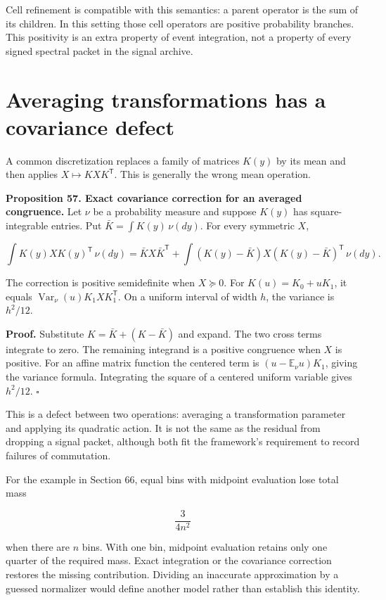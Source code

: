 Cell refinement is compatible with this semantics: a parent operator is
the sum of its children. In this setting those cell operators are
positive probability branches. This positivity is an extra property of
event integration, not a property of every signed spectral packet in the
signal archive.

\section{Averaging transformations has a covariance defect}\label{LSM:averaging-transformations-has-a-covariance-defect}

A common discretization replaces a family of matrices \(K(y)\) by its
mean and then applies \(X\mapsto KXK^{\mathsf T}\). This is generally
the wrong mean operation.

\textbf{Proposition 57. Exact covariance correction for an averaged
congruence.} Let \(\nu\) be a probability measure and suppose \(K(y)\)
has square-integrable entries. Put \(\bar K=\int K(y)\,\nu(dy)\). For
every symmetric \(X\),

\[
\boxed{
\int K(y)XK(y)^{\mathsf T}\,\nu(dy)
=\bar KX\bar K^{\mathsf T}
+\int (K(y)-\bar K)X(K(y)-\bar K)^{\mathsf T}\,\nu(dy).
}
\]

The correction is positive semidefinite when \(X\succeq0\). For
\(K(u)=K_0+uK_1\), it equals
\(\operatorname{Var}_\nu(u)K_1XK_1^{\mathsf T}\). On a uniform interval
of width \(h\), the variance is \(h^2/12\).

\textbf{Proof.} Substitute \(K=\bar K+(K-\bar K)\) and expand. The two
cross terms integrate to zero. The remaining integrand is a positive
congruence when \(X\) is positive. For an affine matrix function the
centered term is \((u-\mathbb E_\nu u)K_1\), giving the variance
formula. Integrating the square of a centered uniform variable gives
\(h^2/12\). \(\square\)

This is a defect between two operations: averaging a transformation
parameter and applying its quadratic action. It is not the same as the
residual from dropping a signal packet, although both fit the
framework's requirement to record failures of commutation.

For the example in Section 66, equal bins with midpoint evaluation lose
total mass

\[
\boxed{\frac{3}{4n^2}}
\]

when there are \(n\) bins. With one bin, midpoint evaluation retains
only one quarter of the required mass. Exact integration or the
covariance correction restores the missing contribution. Dividing an
inaccurate approximation by a guessed normalizer would define another
model rather than establish this identity.


